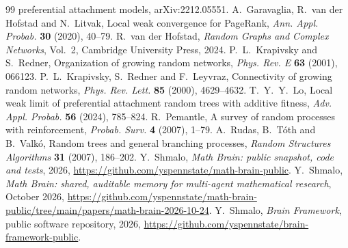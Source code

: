 \documentclass[11pt]{amsart}
\theoremstyle{definition}
\begin{document}
\begin{thebibliography}{99}
preferential attachment models, arXiv:2212.05551.
 A.~Garavaglia, R.~van der Hofstad and N.~Litvak, Local weak convergence for PageRank, \emph{Ann.
Appl. Probab.} \textbf{30} (2020), 40--79.
 R.~van der Hofstad, \emph{Random Graphs and Complex Networks}, Vol.~2, Cambridge University Press,
2024.
 P.~L.~Krapivsky and S.~Redner, Organization of growing random networks, \emph{Phys. Rev. E}
\textbf{63} (2001), 066123.
 P.~L.~Krapivsky, S.~Redner and F.~Leyvraz, Connectivity of growing random networks, \emph{Phys. Rev.
Lett.} \textbf{85} (2000), 4629--4632.
 T.~Y.~Y.~Lo, Local weak limit of preferential attachment random trees with additive fitness,
\emph{Adv. Appl. Probab.} \textbf{56} (2024), 785--824.
 R.~Pemantle, A survey of random processes with reinforcement, \emph{Probab. Surv.} \textbf{4}
(2007), 1--79.
 A.~Rudas, B.~T\'oth and B.~Valk\'o, Random trees and general branching processes, \emph{Random
Structures Algorithms} \textbf{31} (2007), 186--202.
 Y.~Shmalo, \emph{Math Brain: public snapshot, code and tests}, 2026,
\url{https://github.com/yspennstate/math-brain-public}.
 Y.~Shmalo, \emph{Math Brain: shared, auditable memory for multi-agent mathematical research},
October 2026, \url{https://github.com/yspennstate/math-brain-public/tree/main/papers/math-brain-2026-10-24}.
 Y.~Shmalo, \emph{Brain Framework}, public software repository, 2026,
\url{https://github.com/yspennstate/brain-framework-public}.
\end{thebibliography}
\end{document}
